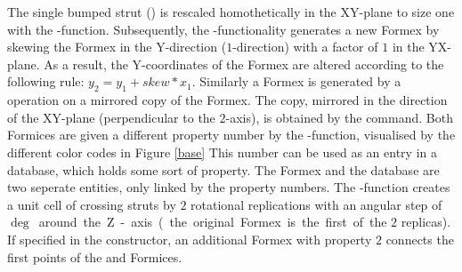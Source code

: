 The single bumped strut () is rescaled homothetically in the XY-plane to size one with the -function. Subsequently, the -functionality generates a new  Formex by skewing the  Formex in the Y-direction ($1$-direction) with a  factor of $1$ in the YX-plane. As a result, the Y-coordinates of the  Formex are altered according to the following rule: $y_2 = y_1 + skew * x_1$. Similarly a  Formex is generated by a  operation on a mirrored copy of the  Formex. The  copy, mirrored in the direction of the XY-plane (perpendicular to the $2$-axis), is obtained by the  command. Both Formices are given a different property number by the -function, visualised by the different color codes in Figure \ref{base} This number can be used as an entry in a database, which holds some sort of property. The Formex and the database are two seperate entities, only linked by the property numbers. The -function creates a unit cell of crossing struts by $2$ rotational replications with an angular step of \unit[180]{$\deg$} around the Z-axis (the original Formex is the first of the $2$ replicas). If specified in the constructor, an additional Formex with property $2$ connects the first points of the  and  Formices.
%


